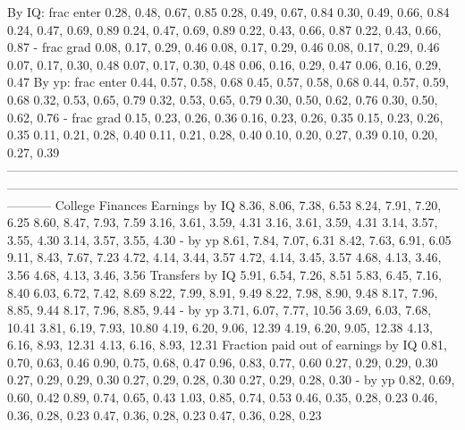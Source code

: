                      By IQ: frac enter      0.28, 0.48, 0.67, 0.85      0.28, 0.49, 0.67, 0.84   0.30, 0.49, 0.66, 0.84     0.24, 0.47, 0.69, 0.89         0.24, 0.47, 0.69, 0.89   0.22, 0.43, 0.66, 0.87   0.22, 0.43, 0.66, 0.87
                           - frac grad      0.08, 0.17, 0.29, 0.46      0.08, 0.17, 0.29, 0.46   0.08, 0.17, 0.29, 0.46     0.07, 0.17, 0.30, 0.48         0.07, 0.17, 0.30, 0.48   0.06, 0.16, 0.29, 0.47   0.06, 0.16, 0.29, 0.47
                     By yp: frac enter      0.44, 0.57, 0.58, 0.68      0.45, 0.57, 0.58, 0.68   0.44, 0.57, 0.59, 0.68     0.32, 0.53, 0.65, 0.79         0.32, 0.53, 0.65, 0.79   0.30, 0.50, 0.62, 0.76   0.30, 0.50, 0.62, 0.76
                           - frac grad      0.15, 0.23, 0.26, 0.36      0.16, 0.23, 0.26, 0.35   0.15, 0.23, 0.26, 0.35     0.11, 0.21, 0.28, 0.40         0.11, 0.21, 0.28, 0.40   0.10, 0.20, 0.27, 0.39   0.10, 0.20, 0.27, 0.39
-----------------------------------------------------------------------------------------------------------------------------------------------------------------------------------------------------------------------------------
                      College Finances                                                                                                                                                                                             
                        Earnings by IQ      8.36, 8.06, 7.38, 6.53      8.24, 7.91, 7.20, 6.25   8.60, 8.47, 7.93, 7.59     3.16, 3.61, 3.59, 4.31         3.16, 3.61, 3.59, 4.31   3.14, 3.57, 3.55, 4.30   3.14, 3.57, 3.55, 4.30
                               - by yp      8.61, 7.84, 7.07, 6.31      8.42, 7.63, 6.91, 6.05   9.11, 8.43, 7.67, 7.23     4.72, 4.14, 3.44, 3.57         4.72, 4.14, 3.45, 3.57   4.68, 4.13, 3.46, 3.56   4.68, 4.13, 3.46, 3.56
                       Transfers by IQ      5.91, 6.54, 7.26, 8.51      5.83, 6.45, 7.16, 8.40   6.03, 6.72, 7.42, 8.69     8.22, 7.99, 8.91, 9.49         8.22, 7.98, 8.90, 9.48   8.17, 7.96, 8.85, 9.44   8.17, 7.96, 8.85, 9.44
                               - by yp     3.71, 6.07, 7.77, 10.56     3.69, 6.03, 7.68, 10.41  3.81, 6.19, 7.93, 10.80    4.19, 6.20, 9.06, 12.39        4.19, 6.20, 9.05, 12.38  4.13, 6.16, 8.93, 12.31  4.13, 6.16, 8.93, 12.31
   Fraction paid out of earnings by IQ      0.81, 0.70, 0.63, 0.46      0.90, 0.75, 0.68, 0.47   0.96, 0.83, 0.77, 0.60     0.27, 0.29, 0.29, 0.30         0.27, 0.29, 0.29, 0.30   0.27, 0.29, 0.28, 0.30   0.27, 0.29, 0.28, 0.30
                               - by yp      0.82, 0.69, 0.60, 0.42      0.89, 0.74, 0.65, 0.43   1.03, 0.85, 0.74, 0.53     0.46, 0.35, 0.28, 0.23         0.46, 0.36, 0.28, 0.23   0.47, 0.36, 0.28, 0.23   0.47, 0.36, 0.28, 0.23
